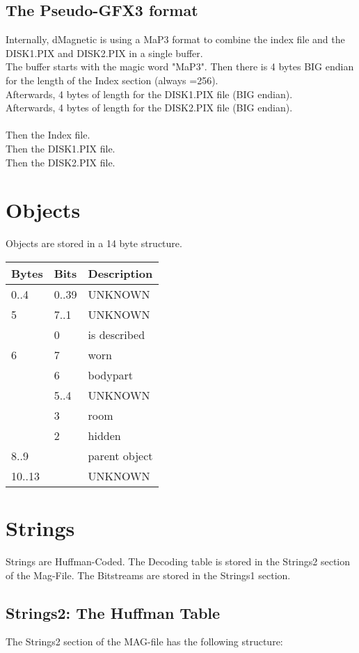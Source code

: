 \documentclass[11pt,twoside,openright]{report}
\begin{document}
\section{The Pseudo-GFX3 format}
Internally, dMagnetic is using a MaP3 format to combine the index file and the DISK1.PIX and DISK2.PIX in a single buffer.\\
The buffer starts with the magic word "MaP3". Then there is 4 bytes BIG endian for the length of the Index section (always =256).\\
Afterwards, 4 bytes of length for the DISK1.PIX file (BIG endian).\\
Afterwards, 4 bytes of length for the DISK2.PIX file (BIG endian).\\
\\
Then the Index file.\\
Then the DISK1.PIX file.\\
Then the DISK2.PIX file.\\
\chapter{Objects}
Objects are stored in a 14 byte structure. \\
\begin{tabular}{l|l|l}
Bytes&Bits&Description\\\hline
0..4&0..39&UNKNOWN\\
5&7..1&UNKNOWN\\
&0&is described\\
6&7&worn\\
&6&bodypart\\
&5..4&UNKNOWN\\
&3&room\\
&2&hidden\\
8..9&&parent object\\
10..13&&UNKNOWN\\
\end{tabular}

\chapter{Strings}
Strings are Huffman-Coded. The Decoding table is stored in the Strings2 section of the Mag-File. The Bitstreams are stored in the Strings1 section.
\section{Strings2: The Huffman Table}
The Strings2 section of the MAG-file has the following structure:
\end{document}
